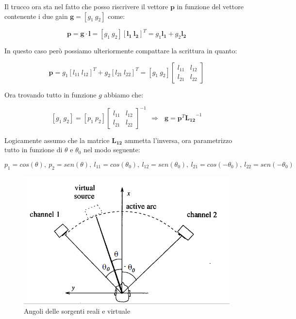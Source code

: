 \documentclass[12pt,a4paper]{report}
\begin{document}
Il trucco ora sta nel fatto che posso riscrivere il vettore $\boldsymbol{p}$ in funzione del vettore contenente i due gain $\boldsymbol{g}= \left[ g_1 \ g_2 \right]$ come:

\begin{equation}
\boldsymbol{p}= \boldsymbol{g} \cdot \boldsymbol{l} = \left[g_1 \ g_2 \right] \left[\boldsymbol{l_{1}} \ \boldsymbol{l_{2}} \right]^T = g_1 \boldsymbol{l_{1}} + g_2 \boldsymbol{l_{2}}
\label{eq:bbbb}
\end{equation}

In questo caso però possiamo ulteriormente compattare la scrittura in quanto:

\begin{equation}
\boldsymbol{p}=g_1 {\left[ l_{11} \ l_{12} \right]}^T + g_2 {\left[ l_{21} \ l_{22} \right]}^T= \left[ g_1 \ g_2 \right] \left[\begin{matrix}
l_{11} & l_{12}\\ l_{21} & l_{22}
\end{matrix} \right]
\label{eq:cccc}
\end{equation}

Ora trovando tutto in funzione $g$ abbiamo che:

\begin{equation}
\left[g_1 \ g_2\right] = \left[ p_1 \ p_2 \right]  {\left[\begin{matrix}
l_{11} & l_{12}\\ l_{21} & l_{22}
\end{matrix} \right]}^{-1} \ \ \Rightarrow \ \ \ \boldsymbol{g}=\boldsymbol{p}^T {\boldsymbol{L_{12}}}^{-1}
\label{eq:dddd}
\end{equation}

Logicamente assumo che la matrice $\boldsymbol{L_{12}}$ ammetta l'inversa, ora parametrizzo tutto in funzione di $\theta$ e $\theta_0$ nel modo seguente:

\[ p_1=cos(\theta),\ p_2=sen(\theta),\ l_{11}=cos(\theta_0),\ l_{12}=sen(\theta_0),\ l_{21}=cos(-\theta_0),\ l_{22}=sen(-\theta_0) \]

\begin{figure}[htbp]
	\centering
	\includegraphics[scale=0.45]{figures/angoli.png}
	\caption {Angoli delle sorgenti reali e virtuale}
	\label{fig:angoli}
	\end{figure}
\end{document}
